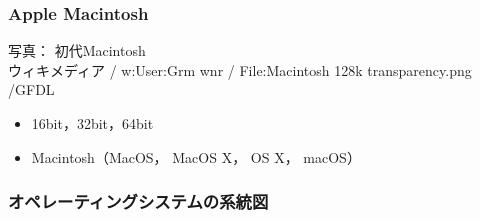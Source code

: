 \documentclass[nomag]{beamer}                   %
\begin{document}
\begin{frame}
  \frametitle{Apple Macintosh}
      {\tiny
        \begin{center}
          写真： 初代Macintosh \\
          ウィキメディア / w:User:Grm wnr / 
          File:Macintosh 128k transparency.png /GFDL
        \end{center}
      }
  \begin{itemize}
    \item 16bit，32bit，64bit
    \item Macintosh（MacOS， MacOS X， OS X， macOS）
  \end{itemize}
\end{frame}

\begin{frame}
  \frametitle{オペレーティングシステムの系統図}
\end{frame}
\end{document}

